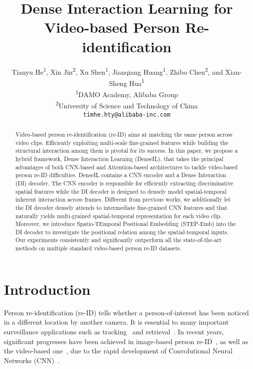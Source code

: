 \documentclass[10pt,twocolumn,letterpaper]{article}
\begin{document}
\title{Dense Interaction Learning for Video-based Person Re-identification}

\author{
	Tianyu He\textsuperscript{1}, Xin Jin\textsuperscript{2}, Xu Shen\textsuperscript{1}, Jianqiang Huang\textsuperscript{1}, Zhibo Chen\textsuperscript{2}, and Xian-Sheng Hua\textsuperscript{1}\\
	\textsuperscript{1}DAMO Academy, Alibaba Group \\
	\textsuperscript{2}University of Science and Technology of China\\
{\tt\small timhe.hty@alibaba-inc.com}
}

\maketitle
\ificcvfinal\thispagestyle{empty}\fi

\begin{abstract}
   Video-based person re-identification (re-ID) aims at matching the same person across video clips. Efficiently exploiting multi-scale fine-grained features while building the structural interaction among them is pivotal for its success. In this paper, we propose a hybrid framework, Dense Interaction Learning (DenseIL), that takes the principal advantages of both CNN-based and Attention-based architectures to tackle video-based person re-ID difficulties. DenseIL contains a CNN encoder and a Dense Interaction (DI) decoder. The CNN encoder is responsible for efficiently extracting discriminative spatial features while the DI decoder is designed to densely model spatial-temporal inherent interaction across frames. Different from previous works, we additionally let the DI decoder densely attends to intermediate fine-grained CNN features and that naturally yields multi-grained spatial-temporal representation for each video clip. Moreover, we introduce Spatio-TEmporal Positional Embedding (STEP-Emb) into the DI decoder to investigate the positional relation among the spatial-temporal inputs. Our experiments consistently and significantly outperform all the state-of-the-art methods on multiple standard video-based person re-ID datasets.
\end{abstract}


\section{Introduction}
\label{sec:intro}

Person re-identification (re-ID) tells whether a person-of-interest has been noticed in a different location by another camera. It is essential to many important surveillance applications such as tracking~\cite{wang2013intelligent} and retrieval~\cite{zheng2017sift}. In recent years, significant progresses have been achieved in image-based person re-ID~\cite{li2014deepreid,su2017pose,sun2018beyond,he2021partial}, as well as the video-based one~\cite{zheng2016mars,li2018diversity,yang2020spatial}, due to the rapid development of Convolutional Neural Networks (CNN)~\cite{krizhevsky2012imagenet}.
\end{document}
